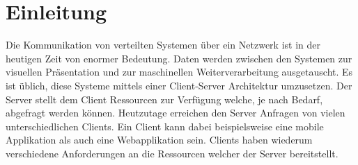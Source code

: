 \chapter{Einleitung}

Die Kommunikation von verteilten Systemen über ein Netzwerk ist in der heutigen Zeit von enormer Bedeutung.
Daten werden zwischen den Systemen zur visuellen Präsentation und zur maschinellen Weiterverarbeitung ausgetauscht.
Es ist üblich, diese Systeme mittels einer Client-Server Architektur umzusetzen.
Der Server stellt dem Client Ressourcen zur Verfügung welche, je nach Bedarf, abgefragt werden können.
Heutzutage erreichen den Server Anfragen von vielen unterschiedlichen Clients.
Ein Client kann dabei beispielsweise eine mobile Applikation als auch eine Webapplikation sein.
Clients haben wiederum verschiedene Anforderungen an die Ressourcen welcher der Server bereitstellt. 

